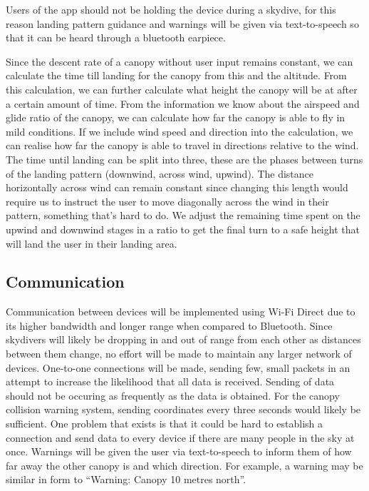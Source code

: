 \documentclass[11pt, a4paper, twocolumn]{article}
\begin{document}
Users of the app should not be holding the device during a skydive, for this reason landing pattern guidance and warnings will be given via text-to-speech so that it can be heard through a bluetooth earpiece.

Since the descent rate of a canopy without user input remains constant, we can calculate the time till landing for the canopy from this and the altitude. From this calculation, we can further calculate what height the canopy will be at after a certain amount of time.
From the information we know about the airspeed and glide ratio of the canopy, we can calculate how far the canopy is able to fly in mild conditions. If we include wind speed and direction into the calculation, we can realise how far the canopy is able to travel in directions relative to the wind.
The time until landing can be split into three, these are the phases between turns of the landing pattern (downwind, across wind, upwind). The distance horizontally across wind can remain constant since changing this length would require us to instruct the user to move diagonally across the wind in their pattern, something that's hard to do. We adjust the remaining time spent on the upwind and downwind stages in a ratio to get the final turn to a safe height that will land the user in their landing area.

\subsection{Communication} %
Communication between devices will be implemented using Wi-Fi Direct due to its higher bandwidth and longer range when compared to Bluetooth. Since skydivers will likely be dropping in and out of range from each other as distances between them change, no effort will be made to maintain any larger network of devices. One-to-one connections will be made, sending few, small packets in an attempt to increase the likelihood that all data is received. Sending of data should not be occuring as frequently as the data is obtained. For the canopy collision warning system, sending coordinates every three seconds would likely be sufficient. One problem that exists is that it could be hard to establish a connection and send data to every device if there are many people in the sky at once.
Warnings will be given the user via text-to-speech to inform them of how far away the other canopy is and which direction. For example, a warning may be similar in form to ``Warning: Canopy 10 metres north''.
\end{document}

